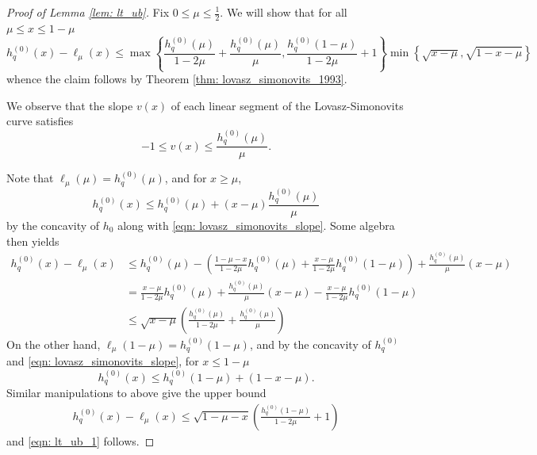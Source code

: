 \documentclass{article}
\newcommand{\set}[1]{\left\{#1\right\}}
\newcommand{\1}{\mathbf{1}}
\theoremstyle{aldenthm}
\theoremstyle{aldenrmrk}
\begin{document}
\begin{proof}[Proof of Lemma \ref{lem: lt_ub}]
	Fix $0 \leq \mu \leq \frac{1}{2}$. We will show that for all $\mu \leq x \leq 1 - \mu$
	\begin{equation}
	\label{eqn: lt_ub_1}
	h_q^{(0)}(x) - \ell_{\mu}(x) \leq \max \set{\frac{h_q^{(0)}(\mu)}{1 - 2\mu} + \frac{h_q^{(0)}(\mu)}{\mu} , \frac{h_q^{(0)}(1 - \mu) }{1 - 2\mu} + 1 } \min \set{\sqrt{x - \mu},\sqrt{1 - x - \mu}}
	\end{equation}
	whence the claim follows by Theorem \ref{thm: lovasz_simonovits_1993}. 
	
	We observe that the slope $v(x)$ of each linear segment of the Lovasz-Simonovits curve satisfies
	\begin{equation}
	\label{eqn: lovasz_simonovits_slope}
	-1 \leq v(x) \leq \frac{h_q^{(0)}(\mu)}{\mu}.
	\end{equation}
	
	Note that $\ell_{\mu}(\mu) = h_q^{(0)}(\mu)$, and for $x \geq \mu$, 
	\begin{equation*}
	h_q^{(0)}(x) \leq h_q^{(0)}(\mu) + (x - \mu)\frac{h_q^{(0)}(\mu)}{\mu}
	\end{equation*}
	by the concavity of $h_0$ along with \eqref{eqn: lovasz_simonovits_slope}. Some algebra then yields
	\begin{align*}
	h_q^{(0)}(x) - \ell_{\mu}(x) & \leq h_q^{(0)}(\mu) - \left(\frac{1 - \mu - x}{1 - 2\mu} h_q^{(0)}(\mu) + \frac{x - \mu}{1 - 2\mu} h_q^{(0)}(1 - \mu)\right) + \frac{h_q^{(0)}(\mu)}{\mu}(x - \mu) \\
	& =  \frac{x - \mu}{1 - 2\mu}h_q^{(0)}(\mu) + \frac{h_q^{(0)}(\mu)}{\mu} (x - \mu) - \frac{x - \mu}{1 - 2\mu} h_q^{(0)}(1 - \mu) \\
	& \leq \sqrt{x - \mu} \left(\frac{h_q^{(0)}(\mu)}{1 - 2\mu} + \frac{h_q^{(0)}(\mu)}{\mu} \right)
	\end{align*}
	On the other hand, $\ell_{\mu}(1 - \mu) = h_q^{(0)}(1 - \mu)$, and by the concavity of $h_q^{(0)}$ and \eqref{eqn: lovasz_simonovits_slope},  for $x \leq 1 - \mu$
	\begin{equation*}
	h_q^{(0)}(x) \leq h_q^{(0)}(1 - \mu) + (1 - x - \mu).
	\end{equation*}
	Similar manipulations to above give the upper bound
	\begin{align*}
	h_q^{(0)}(x) - \ell_{\mu}(x) \leq \sqrt{1 - \mu - x}\left(\frac{h_q^{(0)}(1 - \mu) }{1 - 2\mu} + 1\right)
	\end{align*}
	and \eqref{eqn: lt_ub_1} follows.
\end{proof}
\end{document}
